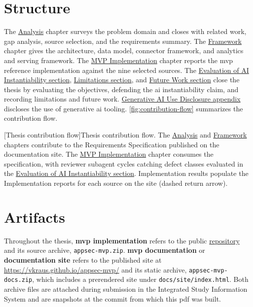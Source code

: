 \section*{Structure}

The \hyperref[ch:analysis]{Analysis} chapter surveys the problem domain and closes with related work, gap analysis, source selection, and the requirements summary. The \hyperref[ch:framework]{Framework} chapter gives the architecture, data model, connector framework, and analytics and serving framework. The \hyperref[ch:implementation]{MVP Implementation} chapter reports the \gls{mvp} reference implementation against the nine selected sources. The \hyperref[sec:ai-eval]{Evaluation of AI Instantiability section}, \hyperref[sec:conclusion-limitations]{Limitations section}, and \hyperref[sec:future-work]{Future Work section} close the thesis by evaluating the objectives, defending the \gls{ai} instantiability claim, and recording limitations and future work. \hyperref[app:genai]{Generative AI Use Disclosure appendix} discloses the use of generative \gls{ai} tooling. \autoref{fig:contribution-flow} summarizes the contribution flow.

\begin{center}
\begin{minipage}{\textwidth}
\centering

[Thesis contribution flow]{Thesis contribution flow. The \hyperref[ch:analysis]{Analysis} and \hyperref[ch:framework]{Framework} chapters contribute to the Requirements Specification published on the documentation site. The \hyperref[ch:implementation]{MVP Implementation} chapter consumes the specification, with reviewer subagent cycles catching defect classes evaluated in the \hyperref[sec:ai-eval]{Evaluation of AI Instantiability section}. Implementation results populate the Implementation reports for each source on the site (dashed return arrow).}
\label{fig:contribution-flow}
\end{minipage}
\end{center}

\section*{Artifacts}

Throughout the thesis, \textbf{\gls{mvp} implementation} refers to the public \href{https://github.com/vkraus/appsec-mvp}{ repository} and its source archive, \texttt{appsec-mvp.zip}. \textbf{\Gls{mvp} documentation} or \textbf{documentation site} refers to the published site at \url{https://vkraus.github.io/appsec-mvp/} and its static archive, \texttt{appsec-mvp-docs.zip}, which includes a prerendered site under \texttt{docs/site/index.html}. Both archive files are attached during submission in the Integrated Study Information System and are snapshots at the commit from which this \gls{pdf} was built.

